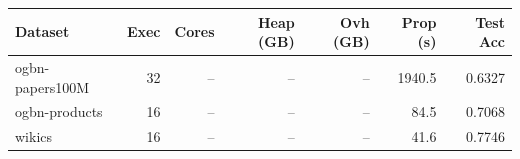 \begin{tabular}{lrrrrrr}
\toprule
Dataset & Exec & Cores & Heap (GB) & Ovh (GB) & Prop (s) & Test Acc \\
\midrule
ogbn-papers100M & 32 & -- & -- & -- & 1940.5 & 0.6327 \\
ogbn-products & 16 & -- & -- & -- & 84.5 & 0.7068 \\
wikics & 16 & -- & -- & -- & 41.6 & 0.7746 \\
\bottomrule
\end{tabular}
